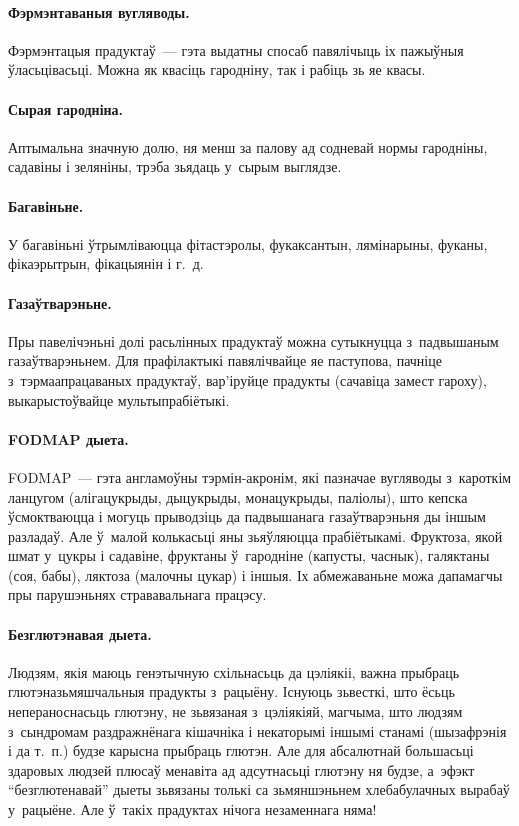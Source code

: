 \paragraph{Фэрмэнтаваныя вугляводы.}
Фэрмэнтацыя прадуктаў~--- гэта выдатны спосаб павялічыць іх пажыўныя ўласьцівасьці. Можна як квасіць гародніну, так і рабіць зь яе квасы.

\paragraph{Сырая гародніна.}
Аптымальна значную долю, ня менш за палову ад содневай нормы гародніны, садавіны і зеляніны, трэба зьядаць у~сырым выглядзе.

\paragraph{Багавіньне.}
У багавіньні ўтрымліваюцца фітастэролы, фукаксантын, лямінарыны, фуканы, фікаэрытрын, фікацыянін і г.~д.

\paragraph{Газаўтварэньне.}
Пры павелічэньні долі расьлінных прадуктаў можна сутыкнуцца з~падвышаным газаўтварэньнем. Для прафілактыкі павялічвайце яе паступова, пачніце з~тэрмаапрацаваных прадуктаў, вар'іруйце прадукты (сачавіца замест гароху), выкарыстоўвайце мультыпрабіётыкі.

\paragraph{FODMAP дыета.}
FODMAP~--- гэта англамоўны тэрмін-акронім, які пазначае вугляводы з~кароткім ланцугом (алігацукрыды, дыцукрыды, монацукрыды, паліолы), што кепска ўсмоктваюцца і могуць прыводзіць да падвышанага газаўтварэньня ды іншым разладаў. Але ў~малой колькасьці яны зьяўляюцца прабіётыкамі. Фруктоза, якой шмат у~цукры і садавіне, фруктаны ў~гародніне (капусты, часнык), галяктаны (соя, бабы), ляктоза (малочны цукар) і іншыя. Іх абмежаваньне можа дапамагчы пры парушэньнях стрававальнага працэсу.

\paragraph{Безглютэнавая дыета.}
Людзям, якія маюць генэтычную схільнасьць да цэліякіі, важна прыбраць глютэназьмяшчальныя прадукты з~рацыёну. Існуюць зьвесткі, што ёсьць непераноснасьць глютэну, не зьвязаная з~цэліякіяй, магчыма, што людзям з~сындромам раздражнёнага кішачніка і некаторымі іншымі станамі (шызафрэнія і да т.~п.) будзе карысна прыбраць глютэн. Але для абсалютнай большасьці здаровых людзей плюсаў менавіта ад адсутнасьці глютэну ня будзе, а~эфэкт ``безглютенавай'' дыеты зьвязаны толькі са зьмяншэньнем хлебабулачных вырабаў у~рацыёне. Але ў~такіх прадуктах нічога незаменнага няма!

